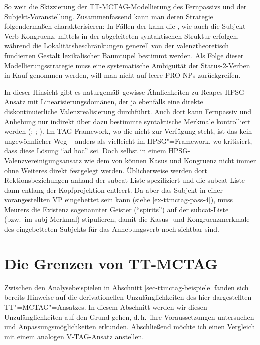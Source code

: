 So weit die Skizzierung der TT-MCTAG-Modellierung des Fernpassivs und der Subjekt-Voranstellung. Zusammenfassend kann man deren Strategie folgenderma\ss en charakterisieren: 
In Fällen der  kann die , wie auch die Subjekt-Verb-Kongruenz, mittels  in der abgeleiteten syntaktischen Struktur erfolgen, während die Lokalitätsbeschränkungen generell von der valenztheoretisch fundierten Gestalt lexikalischer Baumtupel bestimmt werden. Als Folge dieser Modellierungsstrategie muss eine systematische Ambiguität der Status-2-Verben in Kauf genommen werden, will man nicht auf leere PRO-NPs zurückgreifen. 

In dieser Hinsicht gibt es naturgemä\ss\ gewisse Ähnlichkeiten zu Reapes HPSG-Ansatz mit Linearisierungsdomänen, der ja ebenfalls eine direkte diskontinuierliche Valenzrealisierung durchführt. Auch dort kann Fernpassiv und Anhebung nur indirekt über dazu bestimmte syntaktische Merkmale kontrolliert werden (\citealt[Abschnitt~5.1]{Kathol:98}; \citealt[Abschnitt~21.1]{Mueller:99}; \citealt[Abschnitt~8.6]{Kathol:00}). Im TAG-Framework, wo die  nicht zur Verfügung steht, ist das kein ungewöhnlicher Weg -- anders als vielleicht im HPSG"=Framework, wo \citet[279]{Mueller:07} kritisiert, dass diese Lösung "`ad hoc"' sei. Doch selbst in einem HPSG-Valenz\-vereinigungs\-ansatz wie dem von \cite{Meurers:99} können Kasus und Kongruenz nicht immer ohne Weiteres direkt festgelegt werden. Üblicherweise werden dort Rektionsbeziehungen anhand der {\sc subcat}-Liste spezifiziert und die {\sc subcat}-Liste dann entlang der Kopfprojektion entleert. Da aber das Subjekt in einer vorangestellten VP eingebettet sein kann (siehe \ref{ex-ttmctag-pass-4}), muss Meurers die Existenz sogenannter Geister ("`spirits"') auf der {\sc subcat}-Liste (bzw.\ im {\sc subj}-Merkmal) stipulieren, damit die Kasus- und Kongruenzmerkmale des eingebetteten Subjekts für das Anhebungsverb noch sichtbar sind.   



\section{Die Grenzen von TT-MCTAG}\label{sec-ttmctag-grenzen}

Zwischen den Analysebeispielen in Abschnitt \ref{sec-ttmctag-beispiele} fanden sich bereits Hinweise auf die derivationellen Unzulänglichkeiten des hier dargestellten TT"=MCTAG"=Ansatzes. In diesem Abschnitt werden wir diesen Unzulänglichkeiten auf den Grund gehen, d.\,h.\ ihre Voraussetzungen untersuchen und Anpassungsmöglichkeiten erkunden. Abschlie\ss end möchte ich einen Vergleich mit einem analogen V-TAG-Ansatz anstellen.  

